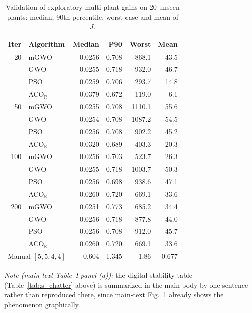 \documentclass[10pt,journal,compsoc]{IEEEtran}
\newcommand{\mgwo}{mGWO}
\newcommand{\acor}{ACO$_\mathbb{R}$}
\begin{document}
\begin{table}[h]
\centering\footnotesize
\caption{Validation of exploratory multi-plant gains on 20 unseen plants: median, 90th percentile, worst case and mean of $J$.}
\label{tab:s_val}
\begin{tabular}{rl rrrr}
\toprule
Iter & Algorithm & Median & P90 & Worst & Mean\\
\midrule
20  & \mgwo{} & 0.0256 & 0.708 & 868.1 & 43.5\\
    & GWO     & 0.0255 & 0.718 & 932.0 & 46.7\\
    & PSO     & 0.0259 & 0.706 & 293.7 & 14.8\\
    & \acor{} & 0.0379 & 0.672 & 119.0 & 6.1\\
\midrule
50  & \mgwo{} & 0.0255 & 0.708 & 1110.1 & 55.6\\
    & GWO     & 0.0254 & 0.708 & 1087.2 & 54.5\\
    & PSO     & 0.0256 & 0.708 & 902.2 & 45.2\\
    & \acor{} & 0.0320 & 0.689 & 403.3 & 20.3\\
\midrule
100 & \mgwo{} & 0.0256 & 0.703 & 523.7 & 26.3\\
    & GWO     & 0.0255 & 0.718 & 1003.7 & 50.3\\
    & PSO     & 0.0256 & 0.698 & 938.6 & 47.1\\
    & \acor{} & 0.0260 & 0.720 & 669.1 & 33.6\\
\midrule
200 & \mgwo{} & 0.0251 & 0.773 & 685.2 & 34.4\\
    & GWO     & 0.0256 & 0.718 & 877.8 & 44.0\\
    & PSO     & 0.0256 & 0.708 & 912.0 & 45.7\\
    & \acor{} & 0.0260 & 0.720 & 669.1 & 33.6\\
\midrule
\multicolumn{2}{l}{Manual $[5,5,4,4]$} & 0.604 & 1.345 & 1.86 & 0.677\\
\bottomrule
\end{tabular}
\end{table}

\begin{table}[h]
\centering\footnotesize
\caption{Cost $J$ on the 20 unseen perturbed plants (training pulse pattern), quintic and B\'ezier references; Sat.\ is the mean \% of saturated steps on the B\'ezier.}
\label{tab:s_bezier_pert}

\end{table}

\noindent\emph{Note (main-text Table~I panel (a)):} the digital-stability table (Table~\ref{tab:s_chatter} above) is summarized in the main body by one sentence rather than reproduced there, since main-text Fig.~1 already shows the phenomenon graphically.
\end{document}
